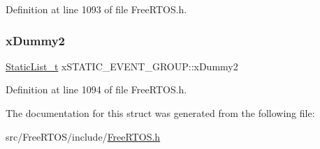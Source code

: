 Definition at line 1093 of file Free\+R\+T\+O\+S.\+h.

\mbox{\label{structx_s_t_a_t_i_c___e_v_e_n_t___g_r_o_u_p_a17d070c972ecd0151d7505a539653551}} 
\subsubsection{\texorpdfstring{x\+Dummy2}{xDummy2}}
{\footnotesize\ttfamily \hyperlink{_free_r_t_o_s_8h_a9735ad9101a2bd25f83a62089a4acee6}{Static\+List\+\_\+t} x\+S\+T\+A\+T\+I\+C\+\_\+\+E\+V\+E\+N\+T\+\_\+\+G\+R\+O\+U\+P\+::x\+Dummy2}



Definition at line 1094 of file Free\+R\+T\+O\+S.\+h.



The documentation for this struct was generated from the following file\+:\begin{DoxyCompactItemize}
\item 
src/\+Free\+R\+T\+O\+S/include/\hyperlink{_free_r_t_o_s_8h}{Free\+R\+T\+O\+S.\+h}\end{DoxyCompactItemize}
